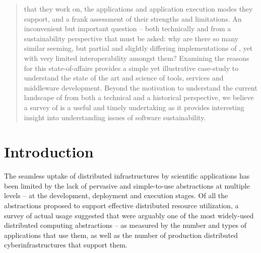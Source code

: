 \documentclass{sig-alternate}
\begin{document}
\begin{abstract}
  that they work on, the applications and application execution modes
  they support, and a frank assessment of their strengths and
  limitations.  An inconvenient but important question -- both
  technically and from a sustainability perspective that must be
  asked: why are there so many similar seeming, but partial and
  slightly differing implementations of \pilotjobs, yet with very
  limited interoperability amongst them?  Examining the reasons for
  this state-of-affairs provides a simple yet illustrative case-study
  to understand the state of the art and science of tools, services
  and middleware development.  Beyond the motivation to understand the
  current landscape of \pilotjobs from both a technical and a
  historical perspective, we believe a survey of \pilotjobs is a
  useful and timely undertaking as it provides interesting insight
  into understanding issues of software sustainability.
\end{abstract}

\section{Introduction}\label{sec:intro}



The seamless uptake of distributed infrastructures by scientific
applications has been limited by the lack of pervasive and
simple-to-use abstractions at multiple levels – at the development,
deployment and execution stages. Of all the abstractions proposed to
support effective distributed resource utilization, a survey of actual
usage suggested that \pilotjobs were arguably one of the most
widely-used distributed computing abstractions – as measured by the
number and types of applications that use them, as well as the number
of production distributed cyberinfrastructures that support them.
\end{document}
